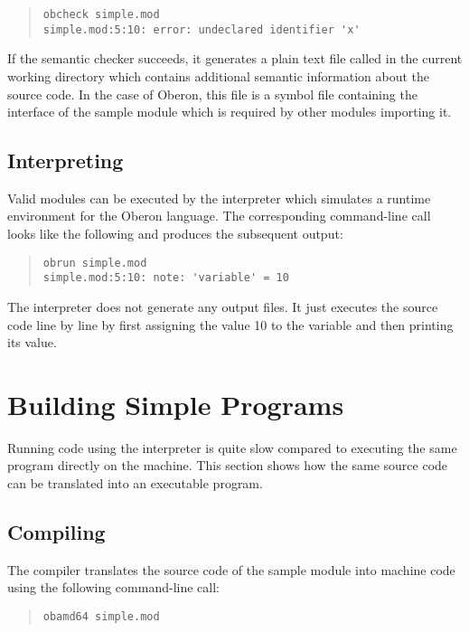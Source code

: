 \begin{quote}\begin{verbatim}
obcheck simple.mod
simple.mod:5:10: error: undeclared identifier 'x'
\end{verbatim}\end{quote}

If the semantic checker succeeds, it generates a plain text file called  in the current working directory which contains additional semantic information about the source code.
In the case of Oberon, this file is a symbol file containing the interface of the sample module which is required by other modules importing it.

\subsection{Interpreting}

Valid modules can be executed by the interpreter which simulates a runtime environment for the Oberon language.
The corresponding command-line call looks like the following and produces the subsequent output:

\begin{quote}\begin{verbatim}
obrun simple.mod
simple.mod:5:10: note: 'variable' = 10
\end{verbatim}\end{quote}

The interpreter does not generate any output files.
It just executes the source code line by line by first assigning the value 10 to the variable and then printing its value.

\section{Building Simple Programs}\label{sec:guidesimple}

Running code using the interpreter is quite slow compared to executing the same program directly on the machine.
This section shows how the same source code can be translated into an executable program.

\subsection{Compiling}

The compiler translates the source code of the sample module into machine code using the following command-line call:

\begin{quote}\begin{verbatim}
obamd64 simple.mod
\end{verbatim}\end{quote}


